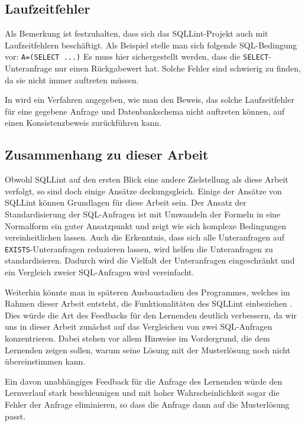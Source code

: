 \subsection{Laufzeitfehler}

Als Bemerkung ist festzuhalten, dass sich das SQLLint-Projekt auch mit Laufzeitfehlern beschäftigt. Als Beispiel stelle man sich folgende SQL-Bedingung vor: \verb|A=(SELECT ...)| Es muss hier sichergestellt werden, dass die \verb|SELECT|-Unteranfrage nur einen Rückgabewert hat. Solche Fehler sind schwierig zu finden, da sie nicht immer auftreten müssen. 

In \cite{brass2} wird ein Verfahren angegeben, wie man den Beweis, das solche Laufzeitfehler für eine gegebene Anfrage und Datenbankschema nicht auftreten können, auf einen Konsistenzbeweis zurückführen kann.

\subsection*{Zusammenhang zu dieser Arbeit}

Obwohl SQLLint auf den ersten Blick eine andere Zielstellung als diese Arbeit verfolgt, so sind doch einige Ansätze deckungsgleich. Einige der Ansätze von SQLLint können Grundlagen für diese Arbeit sein. Der Ansatz der Standardisierung der SQL-Anfragen ist mit Umwandeln der Formeln in eine Normalform ein guter Ansatzpunkt und zeigt wie sich komplexe Bedingungen vereinheitlichen lassen. Auch die Erkenntnis, dass sich alle Unteranfragen auf \verb|EXISTS|-Unteranfragen reduzieren lassen, wird helfen die Unteranfragen zu standardisieren. Dadurch wird die Vielfalt der Unteranfragen eingeschränkt und ein Vergleich zweier SQL-Anfragen wird vereinfacht.

Weiterhin könnte man in späteren Ausbaustadien des Programmes, welches im Rahmen dieser Arbeit entsteht, die Funktionalitäten des SQLLint einbeziehen . Dies würde die Art des Feedbacks für den Lernenden deutlich verbessern, da wir uns in dieser Arbeit zunächst auf das Vergleichen von zwei SQL-Anfragen konzentrieren. Dabei stehen vor allem Hinweise im Vordergrund, die dem Lernenden zeigen sollen, warum seine Lösung mit der Musterlösung noch nicht übereinstimmen kann.

Ein davon unabhängiges Feedback für die Anfrage des Lernenden würde den Lernverlauf stark beschleunigen und mit hoher Wahrscheinlichkeit sogar die Fehler der Anfrage eliminieren, so dass die Anfrage dann auf die Musterlösung passt.